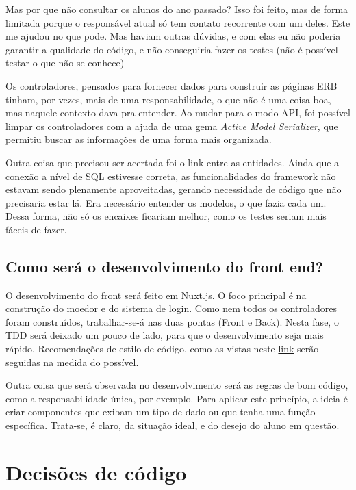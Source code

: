 Mas por que não consultar os alunos do ano passado? Isso foi feito, mas de forma limitada porque o responsável atual
só tem contato recorrente com um deles. Este me ajudou no que pode. Mas haviam outras dúvidas, e com elas eu não
poderia garantir a qualidade do código, e não conseguiria fazer os testes (não é possível testar o que não se
conhece)

Os controladores, pensados para fornecer dados para construir as páginas ERB tinham, por vezes, mais de uma
responsabilidade, o que não é uma coisa boa, mas naquele contexto dava pra entender. Ao mudar para o modo API, foi
possível limpar os controladores com a ajuda de uma gema \emph{Active Model Serializer}, que permitiu buscar as
informações de uma forma mais organizada.

Outra coisa que precisou ser acertada foi o link entre as entidades. Ainda que a conexão a nível de SQL estivesse
correta, as funcionalidades do framework não estavam sendo plenamente aproveitadas, gerando necessidade de código
que não precisaria estar lá. Era necessário entender os modelos, o que fazia cada um. Dessa forma, não só os
encaixes ficariam melhor, como os testes seriam mais fáceis de fazer.

\subsection{Como será o desenvolvimento do front end?}\label{subsec:desenvolvimento}

O desenvolvimento do front será feito em Nuxt.js. O foco principal é na construção do moedor e do sistema de login.
Como nem todos os controladores foram construídos, trabalhar-se-á nas duas pontas (Front e Back). Nesta fase, o TDD
será deixado um pouco de lado, para que o desenvolvimento seja mais rápido. Recomendações de estilo de código, como
as vistas neste \href{https://br.vuejs.org/v2/style-guide/index.html}{link} serão seguidas na medida do possível.

Outra coisa que será observada no desenvolvimento será as regras de bom código, como a responsabilidade única, por
exemplo. Para aplicar este princípio, a ideia é criar componentes que exibam um tipo de dado ou que tenha uma função
específica. Trata-se, é claro, da situação ideal, e do desejo do aluno em questão.

\section{Decisões de código}\label{sec:decisoes}

